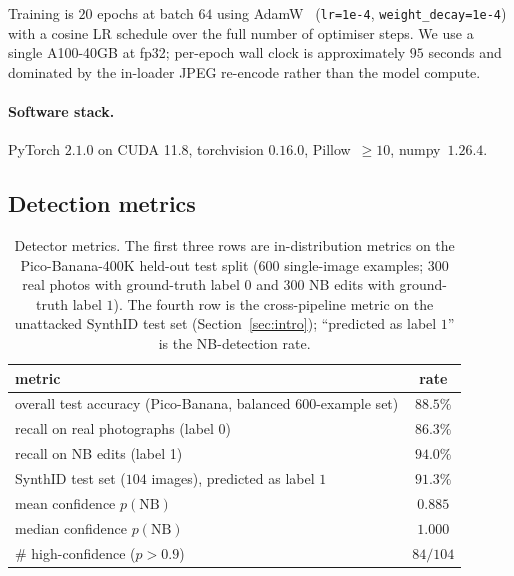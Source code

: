 \documentclass[11pt]{article}
\begin{document}
Training is $20$ epochs at batch $64$ using
AdamW~\citep{loshchilov2019adamw} (\texttt{lr=1e-4}, \texttt{weight\_decay=1e-4})
with a cosine LR schedule over the full number of optimiser steps. We
use a single A100-40GB at fp32; per-epoch wall clock is approximately
$95$ seconds and dominated by the in-loader JPEG re-encode rather than
the model compute.

\paragraph{Software stack.}
PyTorch $2.1.0$ on CUDA 11.8, torchvision $0.16.0$, Pillow~$\ge 10$,
numpy~$1.26.4$.

\subsection{Detection metrics}

\begin{table}[h]
\centering
\caption{Detector metrics. The first three rows are in-distribution
metrics on the Pico-Banana-400K held-out test split ($600$ single-image
examples; $300$ real photos with ground-truth label $0$ and $300$
NB edits with ground-truth label $1$). The fourth row is the
cross-pipeline metric on the unattacked SynthID test set
(Section~\ref{sec:intro}); ``predicted as label $1$'' is the
NB-detection rate.}
\label{tab:detector_metrics}
\vskip 0.05in
\begin{tabular}{lc}
\toprule
metric                                                          & rate \\
\midrule
overall test accuracy (Pico-Banana, balanced 600-example set)   & $\mathbf{88.5\%}$ \\
\hspace{1em}recall on real photographs (label 0)                & $86.3\%$ \\
\hspace{1em}recall on NB edits (label 1)                        & $\mathbf{94.0\%}$ \\
\midrule
SynthID test set ($104$ images), predicted as label $1$         & $\mathbf{91.3\%}$ \\
\hspace{1em} mean confidence $p(\mathrm{NB})$                   & $0.885$ \\
\hspace{1em} median confidence $p(\mathrm{NB})$                 & $1.000$ \\
\hspace{1em} \# high-confidence ($p{>}0.9$)                     & $84 / 104$ \\
\bottomrule
\end{tabular}
\end{table}
\end{document}
